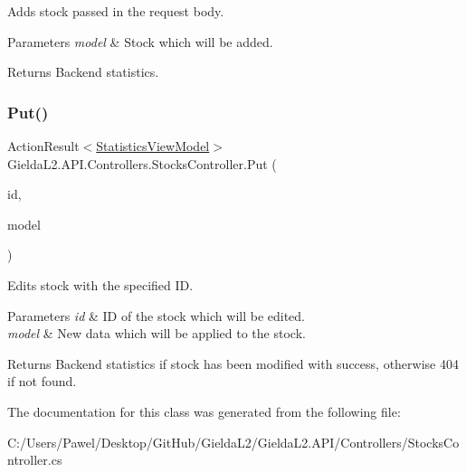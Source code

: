 Adds stock passed in the request body. 


\begin{DoxyParams}{Parameters}
{\em model} & Stock which will be added.\\
\hline
\end{DoxyParams}
\begin{DoxyReturn}{Returns}
Backend statistics.
\end{DoxyReturn}
\mbox{\label{class_gielda_l2_1_1_a_p_i_1_1_controllers_1_1_stocks_controller_af172a21247d956b8dca216622ad0caaf}} 
\subsubsection{\texorpdfstring{Put()}{Put()}}
{\footnotesize\ttfamily Action\+Result$<$\mbox{\hyperlink{class_gielda_l2_1_1_a_p_i_1_1_view_models_1_1_view_1_1_statistics_view_model}{Statistics\+View\+Model}}$>$ Gielda\+L2.\+A\+P\+I.\+Controllers.\+Stocks\+Controller.\+Put (\begin{DoxyParamCaption}\item[{int}]{id,  }\item[{\mbox{[}\+From\+Body\mbox{]} \mbox{\hyperlink{class_gielda_l2_1_1_a_p_i_1_1_view_models_1_1_edit_1_1_edit_stock_view_model}{Edit\+Stock\+View\+Model}}}]{model }\end{DoxyParamCaption})}



Edits stock with the specified ID. 


\begin{DoxyParams}{Parameters}
{\em id} & ID of the stock which will be edited.\\
\hline
{\em model} & New data which will be applied to the stock.\\
\hline
\end{DoxyParams}
\begin{DoxyReturn}{Returns}
Backend statistics if stock has been modified with success, otherwise 404 if not found.
\end{DoxyReturn}


The documentation for this class was generated from the following file\+:\begin{DoxyCompactItemize}
\item 
C\+:/\+Users/\+Pawel/\+Desktop/\+Git\+Hub/\+Gielda\+L2/\+Gielda\+L2.\+A\+P\+I/\+Controllers/Stocks\+Controller.\+cs\end{DoxyCompactItemize}
